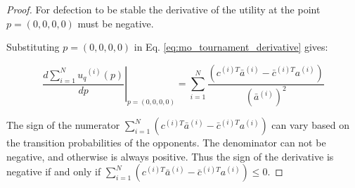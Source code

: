 \documentclass[10pt]{article}
\begin{document}
\begin{proof}
    For defection to be stable the derivative of the utility
    at the point \(p = (0, 0, 0, 0)\) must be negative.

    Substituting \(p = (0, 0, 0, 0)\) in
    Eq. \ref{eq:mo_tournament_derivative} gives:

    \begin{equation}
        \left.\frac{d\sum\limits_{i=1} ^ {N} {u_q}^{(i)} (p)}{dp} \right\rvert_{p=(0,0,0,0)} =
    \sum_{i=1} ^ N \frac{(c^{(i)T} \bar{a}^{(i)} - \bar{c}^{(i)T} a^{(i)})}
    {(\bar{a}^{(i)})^2}
    \end{equation}

    The sign of the numerator \( \displaystyle\sum_{i=1} ^ N (c^{(i)T} \bar{a}^{(i)} - \bar{c}^{(i)T} a^{(i)})\)
    can vary based on the transition probabilities of the opponents.
    The denominator can not be negative, and otherwise is always positive.
    Thus the sign of the derivative is negative if and only if
    \( \displaystyle\sum_{i=1} ^ N (c^{(i)T} \bar{a}^{(i)} - \bar{c}^{(i)T} a^{(i)}) \leq 0\).
\end{proof}
\end{document}
